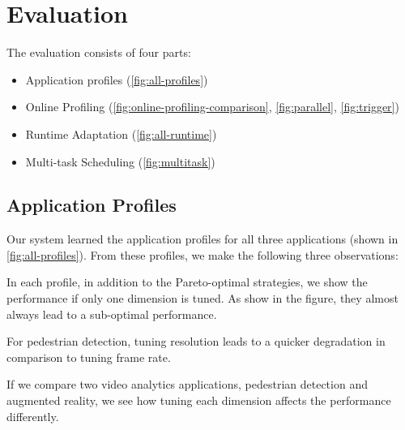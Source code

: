 \section{Evaluation}
\label{sec:evaluation}

The evaluation consists of four parts:

\begin{itemize}
\item Application profiles (\autoref{fig:all-profiles})
\item Online Profiling (\autoref{fig:online-profiling-comparison},
  \autoref{fig:parallel}, \autoref{fig:trigger})
\item Runtime Adaptation (\autoref{fig:all-runtime})
\item Multi-task Scheduling (\autoref{fig:multitask})
\end{itemize}

\subsection{Application Profiles}
\label{sec:application-profiles}

Our system learned the application profiles for all three applications (shown in
\autoref{fig:all-profiles}). From these profiles, we make the following three
observations:

 In each profile,
in addition to the Pareto-optimal strategies, we show the performance if only
one dimension is tuned. As show in the figure, they almost always lead to a
sub-optimal performance.

For pedestrian detection, tuning resolution leads to a quicker degradation in
comparison to tuning frame rate.

If we compare two video analytics applications, pedestrian detection and
augmented reality, we see how tuning each dimension affects the performance
differently.

